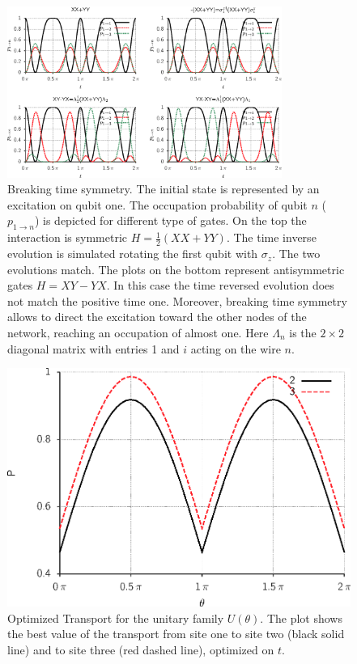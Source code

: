 \documentclass[aps,pra,12pt,nofootinbib,superscriptaddress,longbibliography,showpacs]{revtex4-1}
\theoremstyle{plain}
\theoremstyle{definition}
\begin{document}
\begin{figure}[p]
  \centering
  \includegraphics[width=0.8\textwidth]{3qbit_001}
  \caption{Breaking time symmetry.
  The initial state is represented by an excitation on qubit one. The
  occupation probability of qubit $n$ ($p_{1\to n}$) is depicted for different
  type of gates.
  On the top the interaction is symmetric $H=\frac 12 (XX+YY)$. The time inverse
  evolution is simulated rotating the first qubit with $\sigma_z$. The two
  evolutions match.
  The plots on the bottom represent antisymmetric gates $H=XY-YX$. In this
  case the time reversed evolution does not match the positive time one.
  Moreover, breaking time symmetry allows to direct the excitation
  toward the other nodes of the network, reaching an occupation of almost one.
  Here $\Lambda_n$ is the $2\times2$ diagonal matrix with entries 1 and $i$
  acting on the wire $n$.
  }
  \label{fig:init1}
\end{figure}



\begin{figure}[p]
	\begin{center}
		\includegraphics{opt-time}
	\end{center}
	\caption{Optimized Transport for the unitary family $U(\theta)$.
	The plot shows the best value of the transport from site one to site two
	(black solid line) and to site three (red dashed line), optimized on
$t$.}
	\label{fig:opt}
\end{figure}
\end{document}
